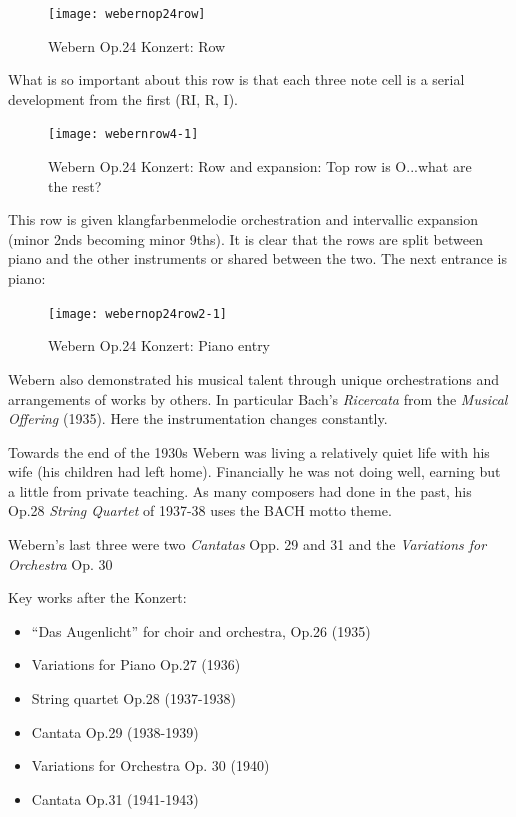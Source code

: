 \begin{figure}[H]
\centering
\texttt{[image: webernop24row]}\caption{Webern Op.24 Konzert: Row}
\label{fig:op24row}
\end{figure}

What is so important about this row is that each three note cell is a serial development from the first (RI, R, I).

\begin{figure}[H]
\centering
\texttt{[image: webernrow4-1]}\caption{Webern Op.24 Konzert: Row and expansion: Top row is O...what are the rest?}
\label{fig:op24row2}
\end{figure}

This row is given klangfarbenmelodie orchestration and intervallic expansion (minor 2nds becoming minor 9ths). It is clear that the rows are split between piano and the other instruments or shared between the two. The next entrance is piano:

\begin{figure}[H]
\centering
\texttt{[image: webernop24row2-1]}\caption{Webern Op.24 Konzert: Piano entry}
\label{fig:op24row}
\end{figure}




Webern also demonstrated his musical talent through unique orchestrations and arrangements of works by others. In particular Bach's \textit{Ricercata} from the \textit{Musical Offering} (1935). Here the instrumentation changes constantly. 

Towards the end of the 1930s Webern was living a relatively quiet life with his wife (his children had left home). Financially he was not doing well, earning but a little from private teaching. As many composers had done in the past, his Op.28 \textit{String Quartet} of 1937-38 uses the BACH motto theme. 

Webern's last three were two \textit{Cantatas} Opp. 29 and 31 and the \textit{Variations for Orchestra} Op. 30

Key works after the Konzert:
\begin{itemize}
\item ``Das Augenlicht'' for choir and orchestra, Op.26 (1935)
\item Variations for Piano Op.27 (1936)
\item String quartet Op.28 (1937-1938)
\item Cantata Op.29 (1938-1939)
\item Variations for Orchestra Op. 30 (1940)
\item Cantata Op.31 (1941-1943)
\end{itemize}

